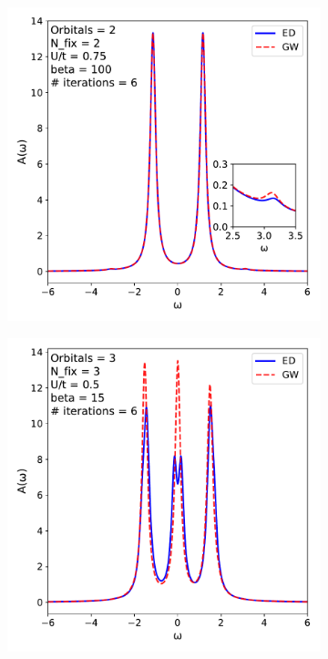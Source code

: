 \documentclass[12pt]{article}
\begin{document}
\begin{figure}[h!]
\begin{subfigure}[b]{0.45\textwidth}
  \end{subfigure}
  \hspace{0.05\textwidth}
    \begin{subfigure}[b]{0.45\textwidth}
    \includegraphics[width=\textwidth]{specgw22.pdf}
  \end{subfigure}
  \hspace{0.02\textwidth}
  \begin{subfigure}[b]{0.45\textwidth}
    \includegraphics[width=\textwidth]{specgw33.pdf}
  \end{subfigure}
\end{figure}\\
\end{document}
